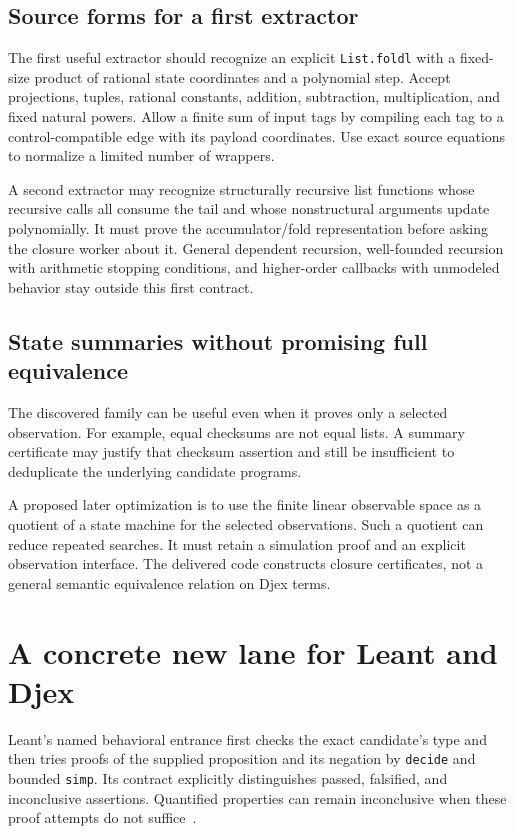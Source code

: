 \documentclass[11pt,letterpaper]{article}
\theoremstyle{definition}
\newcommand{\code}[1]{\nolinkurl{#1}}
\begin{document}
\subsection{Source forms for a first extractor}
The first useful extractor should recognize an explicit \code{List.foldl}
with a fixed-size product of rational state coordinates and a polynomial step.
Accept projections, tuples, rational constants, addition, subtraction,
multiplication, and fixed natural powers. Allow a finite sum of input tags by
compiling each tag to a control-compatible edge with its payload coordinates.
Use exact source equations to normalize a limited number of wrappers.

A second extractor may recognize structurally recursive list functions whose
recursive calls all consume the tail and whose nonstructural arguments update
polynomially. It must prove the accumulator/fold representation before asking
the closure worker about it. General dependent recursion, well-founded
recursion with arithmetic stopping conditions, and higher-order callbacks with
unmodeled behavior stay outside this first contract.

\subsection{State summaries without promising full equivalence}
The discovered family can be useful even when it proves only a selected
observation. For example, equal checksums are not equal lists. A summary
certificate may justify that checksum assertion and still be insufficient to
deduplicate the underlying candidate programs.

A proposed later optimization is to use the finite linear observable space as
a quotient of a state machine for the selected observations. Such a quotient
can reduce repeated searches. It must retain a simulation proof and an explicit
observation interface. The delivered code constructs closure certificates, not
a general semantic equivalence relation on Djex terms.

\section{A concrete new lane for Leant and Djex}
\label{sec:leant}

Leant's named behavioral entrance first checks the exact candidate's type and
then tries proofs of the supplied proposition and its negation by
\code{decide} and bounded \code{simp}. Its contract explicitly distinguishes
passed, falsified, and inconclusive assertions. Quantified properties can
remain inconclusive when these proof attempts do not suffice~\cite{leant-behavior}.
\end{document}
